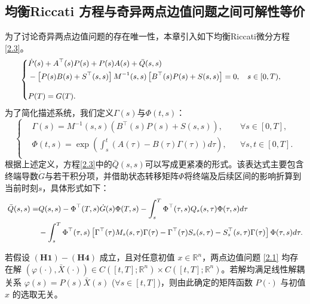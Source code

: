 \documentclass{GZUbachelorthesis}
\begin{document}
\subsection{均衡Riccati 方程与奇异两点边值问题之间可解性等价}
为了讨论奇异两点边值问题的存在唯一性，本章引入如下均衡Riccati微分方程\eqref{2.3}。
\begin{equation}\label{2.3}
	{\small
		\left\{
		\begin{aligned}
			&\dot{P}(s)+A^\top(s)P(s)+P(s)A(s)+\bar{Q}(s,s)\\
			&-\left[P(s)B(s)+S^\top(s,s)\right]M^{-1}(s,s)\left[B^\top(s)P(s)+S(s,s)\right] = 0, && s\in[0,T),\\[8pt]
			&P(T)=G(T).
		\end{aligned}
		\right.
	}
\end{equation}
为了简化描述系统，我们定义$\Gamma(s)$与$\Phi(t,s)$：
\begin{equation}\label{2.4}
	\left\{
	\begin{aligned}
		&\Gamma(s)=M^{-1}(s,s)\left(B^\top(s)P(s)+S(s,s)\right), &&\forall s\in [0,T],\\[8pt]
		&\Phi(t,s)=\exp\left(\int_{s}^{t}\left(A(\tau)-B(\tau)\Gamma(\tau)\right)d\tau\right), &&\forall s,t\in [0,T].\\[8pt]
	\end{aligned}
	\right.
\end{equation}
根据上述定义，方程\eqref{2.3}中的$\bar{Q}(s,s)$可以写成更紧凑的形式。该表达式主要包含终端导数$\dot{G}$与若干积分项，并借助状态转移矩阵$\Phi$将终端及后续区间的影响折算到当前时刻$s$，具体形式如下：
\begin{equation}\label{2.5}
	{\small
		\begin{aligned}
			\bar{Q}(s,s)=&Q(s,s)-\Phi^\top(T,s)\dot{G}(s)\Phi(T,s)-\int_{s}^{T}\Phi^\top(\tau,s)Q_s(s,\tau)\Phi(\tau,s)d\tau \\
			&-\int_{s}^{T}\Phi^\top(\tau,s)\left[\Gamma^\top(\tau)M_s(s,\tau)\Gamma(\tau)-\Gamma^\top(\tau)S_s(s,\tau)-S_s^\top(s,\tau)\Gamma(\tau)\right]\Phi(\tau,s)d\tau.
	\end{aligned}}
\end{equation} 
\begin{lem}\label{thm2.3.2}
	若假设 $\mathbf{(H1)-(H4)}$ 成立，且对任意初值 $x \in \mathbb{R}^n$，两点边值问题 \eqref{2.1} 均存在解 $(\varphi(\cdot), \bar{X}(\cdot)) \in C([t,T];\mathbb{R}^n) \times C([t,T];\mathbb{R}^n)$。若解均满足线性解耦关系 $\varphi(s) = P(s)\bar{X}(s)$ ($\forall s \in [t,T]$)，则由此确定的矩阵函数 $P(\cdot)$ 与初值 $x$ 的选取无关。
\end{lem}
\end{document}
